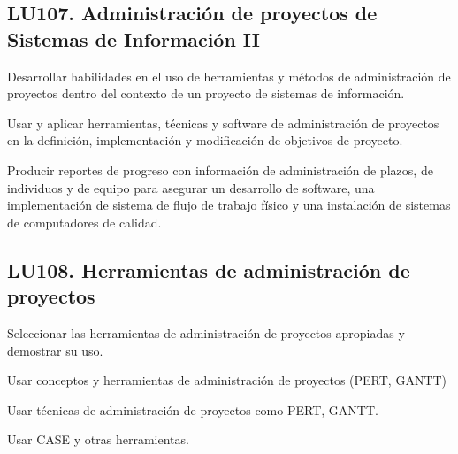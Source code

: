 \subsection{LU107. Administración de proyectos  de Sistemas de Información II}\label{sec:BOK-LU107}\label{sec:LU107}
\begin{LearningUnit}
\begin{LUGoal}
\item Desarrollar habilidades en el uso de herramientas y métodos de administración de proyectos dentro del contexto de un proyecto de sistemas de información.
\end{LUGoal}

\begin{LUObjective}
\item Usar y aplicar herramientas, técnicas y software de administración de proyectos en la definición, implementación y modificación de objetivos de proyecto.
\item Producir reportes de progreso con información de administración de plazos, de individuos y de equipo para asegurar un desarrollo de software, una implementación de sistema de flujo de trabajo físico y una instalación de sistemas de computadores de calidad.
\end{LUObjective}
\end{LearningUnit}

\subsection{LU108. Herramientas de administración de proyectos}\label{sec:BOK-LU108}\label{sec:LU108}
\begin{LearningUnit}
\begin{LUGoal}
\item Seleccionar las herramientas de administración de proyectos apropiadas y demostrar su uso.
\end{LUGoal}

\begin{LUObjective}
\item Usar conceptos y herramientas de administración de proyectos  (PERT, GANTT)
\item Usar técnicas de administración de proyectos como PERT, GANTT.
\item Usar CASE y otras herramientas.
\end{LUObjective}
\end{LearningUnit}

